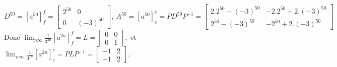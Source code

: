 {{$$D^{50}=[a^{50}]_f^f=\left[\begin{array}{rr}2^{50}&0\\0&(-3)^{50}\end{array}\right],
\ A^{50}=[a^{50}]_e^e=PD^{50}P^{-1}=\left[\begin{array}{rr}
2.2^{50}-(-3)^{50}&-2.2^{50}+2.(-3)^{50}\\2^{50}-(-3)^{50}&-2^{50}+2.(-3)^{50}
\end{array}\right]$$
Donc $\lim_{n\infty}\frac{1}{3^{2n}}[a^{2n}]_f^f=L=
\left[\begin{array}{rr}0&0\\0&1\end{array}\right],$ et
$\lim_{n\infty}\frac{1}{3^{2n}}[a^{2n}]_e^e=PLP^{-1}=\left[\begin{array}{rr}
-1&2\\-1&2\end{array}\right].$
}
}
